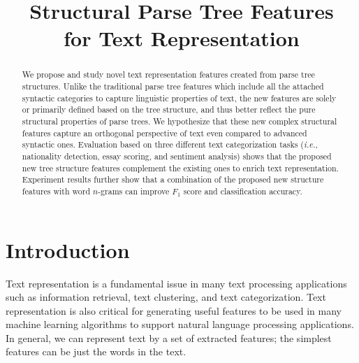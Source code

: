 \documentclass[conference]{IEEEtran}
\begin{document}
\title{Structural Parse Tree Features \\ for Text Representation}

\author{%
    \and

    \and
}

\maketitle

\begin{abstract}
We propose and study novel text representation features created from parse tree
structures. Unlike the traditional parse tree features which include all the
attached syntactic categories to capture linguistic properties of text, the new
features are solely or primarily defined based on the tree structure, and thus
better reflect the pure structural properties of parse trees. We hypothesize
that these new complex structural features capture an orthogonal perspective of
text even compared to advanced syntactic ones. Evaluation based on three
different text categorization tasks (\emph{i.e.}, nationality detection, essay
scoring, and sentiment analysis) shows that the proposed new tree structure
features complement the existing ones to enrich text representation. Experiment
results further show that a combination of the proposed new structure features
with word $n$-grams can improve $F_1$ score and classification accuracy.
\end{abstract}

\section{Introduction}

Text representation is a fundamental issue in many text processing applications
such as information retrieval, text clustering, and text categorization. Text
representation is also critical for generating useful features to be used in
many machine learning algorithms to support natural language processing
applications. In general, we can represent text by a set of extracted features;
the simplest features can be just the words in the text. 
\end{document}
